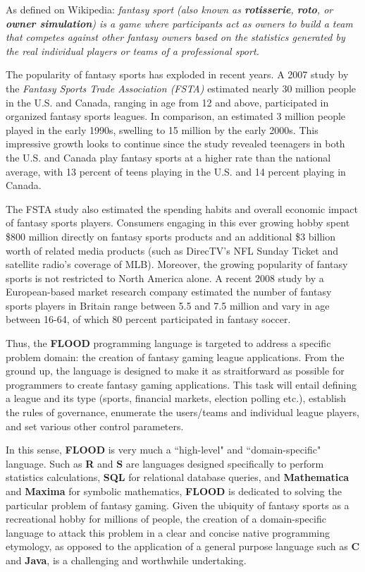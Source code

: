 \documentclass[12pt]{report}
\begin{document}
\begin{doublespace}
As defined on Wikipedia: \textit{fantasy sport (also known as \textbf{rotisserie}, \textbf{roto}, or \textbf{owner simulation}) is a game where participants act as owners to build a team that competes against other fantasy owners based on the statistics generated by the real individual players or teams of a professional sport.}

The popularity of fantasy sports has exploded in recent years. A 2007 study by the \textit{Fantasy Sports Trade Association (FSTA)} estimated  nearly 30 million people in the U.S. and Canada, ranging in age from 12 and above, participated in organized fantasy sports leagues. In comparison, an estimated 3 million people played in the early 1990s, swelling to 15 million by the early 2000s. This impressive growth looks to continue since the study revealed teenagers in both the U.S. and Canada play fantasy sports at a higher rate than the national average, with 13 percent of teens playing in the U.S. and 14 percent playing in Canada.

The FSTA study also estimated the spending habits and overall economic impact of fantasy sports players. Consumers engaging in this ever growing hobby spent \$800 million directly on fantasy sports products and an additional \$3 billion worth of related media products (such as DirecTV's NFL Sunday Ticket and satellite radio's coverage of MLB). Moreover, the growing popularity of fantasy sports is not restricted to North America alone. A recent 2008 study by a European-based market research company estimated the number of fantasy sports players in Britain range between 5.5 and 7.5 million and vary in age between 16-64, of which 80 percent participated in fantasy soccer.

Thus, the \textbf{FLOOD} programming language is targeted to address a specific problem domain: the creation of fantasy gaming league applications. From the ground up, the language is designed to make it as straitforward as possible for programmers to create fantasy gaming applications. This task will entail defining a league and its type (sports, financial markets, election polling etc.), establish the rules of governance, enumerate the users/teams and individual league players, and set various other control parameters. 

In this sense, \textbf{FLOOD} is very much a ``high-level" and ``domain-specific" language. Such as \textbf{R} and \textbf{S} are languages designed specifically to perform statistics calculations, \textbf{SQL} for relational database queries, and \textbf{Mathematica} and \textbf{Maxima} for symbolic mathematics, \textbf{FLOOD} is dedicated to solving the particular problem of fantasy gaming. Given the ubiquity of fantasy sports as a recreational hobby for millions of people, the creation of a domain-specific language to attack this problem in a clear and concise native programming etymology, as opposed to the application of a general purpose language such as \textbf{C} and \textbf{Java}, is a challenging and worthwhile undertaking.
\end{doublespace}
\end{document}
